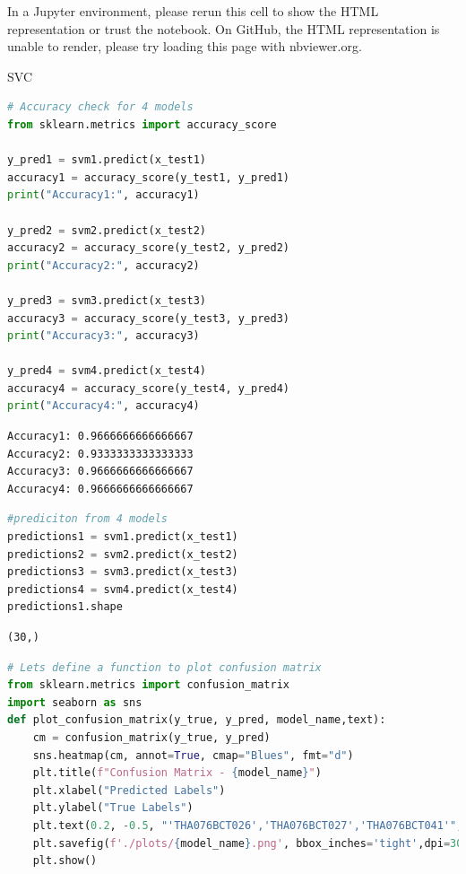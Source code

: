 \documentclass[
]{article}
\begin{document}
\hypertarget{sk-container-id-36}{}
In a Jupyter environment, please rerun this cell to show the HTML
representation or trust the notebook. On GitHub, the HTML representation
is unable to render, please try loading this page with nbviewer.org.

SVC

\begin{lstlisting}[language=Python]
# Accuracy check for 4 models
from sklearn.metrics import accuracy_score

y_pred1 = svm1.predict(x_test1)
accuracy1 = accuracy_score(y_test1, y_pred1)
print("Accuracy1:", accuracy1)

y_pred2 = svm2.predict(x_test2)
accuracy2 = accuracy_score(y_test2, y_pred2)
print("Accuracy2:", accuracy2)

y_pred3 = svm3.predict(x_test3)
accuracy3 = accuracy_score(y_test3, y_pred3)
print("Accuracy3:", accuracy3)

y_pred4 = svm4.predict(x_test4)
accuracy4 = accuracy_score(y_test4, y_pred4)
print("Accuracy4:", accuracy4)
\end{lstlisting}

\begin{lstlisting}
Accuracy1: 0.9666666666666667
Accuracy2: 0.9333333333333333
Accuracy3: 0.9666666666666667
Accuracy4: 0.9666666666666667
\end{lstlisting}

\begin{lstlisting}[language=Python]
#prediciton from 4 models
predictions1 = svm1.predict(x_test1)
predictions2 = svm2.predict(x_test2)
predictions3 = svm3.predict(x_test3)
predictions4 = svm4.predict(x_test4)
predictions1.shape
\end{lstlisting}

\begin{lstlisting}
(30,)
\end{lstlisting}

\begin{lstlisting}[language=Python]
# Lets define a function to plot confusion matrix
from sklearn.metrics import confusion_matrix
import seaborn as sns
def plot_confusion_matrix(y_true, y_pred, model_name,text):
    cm = confusion_matrix(y_true, y_pred)
    sns.heatmap(cm, annot=True, cmap="Blues", fmt="d")
    plt.title(f"Confusion Matrix - {model_name}")
    plt.xlabel("Predicted Labels")
    plt.ylabel("True Labels")
    plt.text(0.2, -0.5, "'THA076BCT026','THA076BCT027','THA076BCT041'", fontsize=8,color='red')
    plt.savefig(f'./plots/{model_name}.png', bbox_inches='tight',dpi=300)
    plt.show()
\end{lstlisting}
\end{document}
